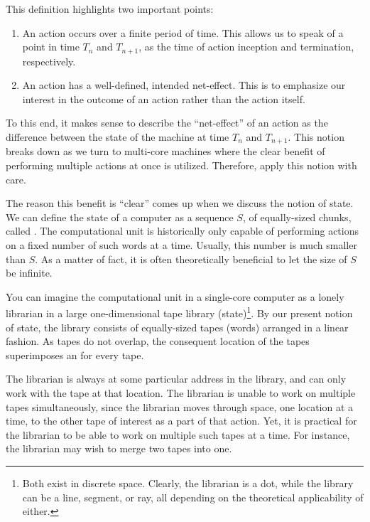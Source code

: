 This definition highlights two important points:

\begin{enumerate}

\item An action occurs over a finite period of time. This allows us to speak of
a point in time $T_n$ and $T_{n+1}$, as the time of action inception and
termination, respectively.

\item An action has a well-defined, intended net-effect. This is to emphasize
our interest in the outcome of an action rather than the action itself.

\end{enumerate}

To this end, it makes sense to describe the ``net-effect'' of an action as the
difference between the state of the machine at time $T_n$ and $T_{n+1}$. This
notion breaks down as we turn to multi-core machines where the clear benefit of
performing multiple actions at once is utilized. Therefore, apply this notion
with care.

The reason this benefit is ``clear'' comes up when we discuss the notion of
state. We can define the state of a computer as a sequence $S$, of
equally-sized chunks, called . The computational unit is historically
only capable of performing actions on a fixed number of such words at a time.
Usually, this number is much smaller than $S$. As a matter of fact, it is often
theoretically beneficial to let the size of $S$ be infinite.

You can imagine the computational unit in a single-core computer as a lonely
librarian in a large one-dimensional tape library (state)\footnote{Both exist
in discrete space. Clearly, the librarian is a dot, while the library can be a
line, segment, or ray, all depending on the theoretical applicability of
either.}. By our present notion of state, the library consists of equally-sized
tapes (words) arranged in a linear fashion.  As tapes do not overlap, the
consequent location of the tapes superimposes an  for every tape.

The librarian is always at some particular address in the library, and can only
work with the tape at that location. The librarian is unable to work on
multiple tapes simultaneously, since the librarian moves through space, one
location at a time, to the other tape of interest as a part of that action.
Yet, it is practical for the librarian to be able to work on multiple such
tapes at a time. For instance, the librarian may wish to merge two tapes into
one.

